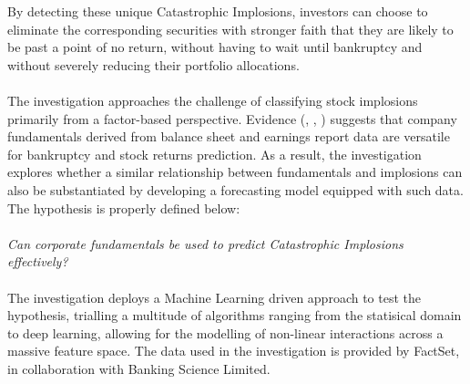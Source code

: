 \documentclass[a4paper]{report}
\begin{document}
By detecting these unique Catastrophic Implosions, investors can choose to eliminate the corresponding securities with stronger faith that they are likely to be past a point of no return, without having to wait until bankruptcy and without severely reducing their portfolio allocations.\\\\The investigation 
approaches the challenge of classifying stock implosions primarily from a factor-based perspective. Evidence (\citep{altman1968financial}, \citep{fama1993common}, \citep{fama1992cross}) suggests 
that company fundamentals derived from balance sheet and earnings report data are versatile for bankruptcy and stock returns prediction. As a result, the investigation explores whether a similar relationship between fundamentals and implosions can also be
substantiated by developing a forecasting model equipped with such data. The hypothesis is properly defined below:\\\\\textit{Can corporate fundamentals be used to predict Catastrophic Implosions effectively?}\\\\The investigation deploys a Machine Learning driven approach to test the hypothesis, trialling a multitude of algorithms ranging from the statisical 
domain to deep learning, allowing for the modelling of non-linear interactions across a massive feature space. The data used in the investigation is provided by FactSet, in collaboration with Banking Science Limited. 
\end{document}
